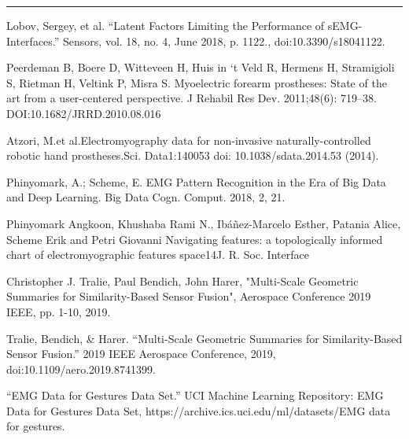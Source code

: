 \documentclass[11pt]{article}
\begin{document}
\begin{center}
\noindent\rule{16cm}{0.4pt}
\end{center}


\begin{thebibliography}{5}

 Lobov, Sergey, et al. “Latent Factors Limiting the Performance of sEMG-Interfaces.” Sensors, vol. 18, no. 4, June 2018, p. 1122., doi:10.3390/s18041122.

 Peerdeman  B,  Boere  D,  Witteveen  H,  Huis  in  ‘t  Veld  R,  Hermens H, Stramigioli S, Rietman H, Veltink P, Misra S. Myoelectric  forearm  prostheses:  State  of  the  art  from  a  user-centered perspective. J Rehabil Res Dev. 2011;48(6): 719–38. DOI:10.1682/JRRD.2010.08.016

 Atzori, M.et al.Electromyography data for non-invasive naturally-controlled robotic hand prostheses.Sci. Data1:140053 doi: 10.1038/sdata.2014.53 (2014).

 Phinyomark, A.; Scheme, E. EMG Pattern Recognition in the Era of Big Data and Deep Learning. Big Data Cogn. Comput. 2018, 2, 21. 

 Phinyomark Angkoon, Khushaba Rami N., Ibáñez-Marcelo Esther, Patania Alice, Scheme Erik and Petri Giovanni Navigating features: a topologically informed chart of electromyographic features space14J. R. Soc. Interface

 Christopher J. Tralie, Paul Bendich, John Harer, "Multi-Scale Geometric Summaries for Similarity-Based Sensor Fusion", Aerospace Conference 2019 IEEE, pp. 1-10, 2019.

 Tralie, Bendich, \& Harer. “Multi-Scale Geometric Summaries for Similarity-Based Sensor Fusion.” 2019 IEEE Aerospace Conference, 2019, doi:10.1109/aero.2019.8741399.

 “EMG Data for Gestures Data Set.” UCI Machine Learning Repository: EMG Data for Gestures Data Set, https://archive.ics.uci.edu/ml/datasets/EMG data for gestures.

\end{thebibliography}
  
\end{document}
